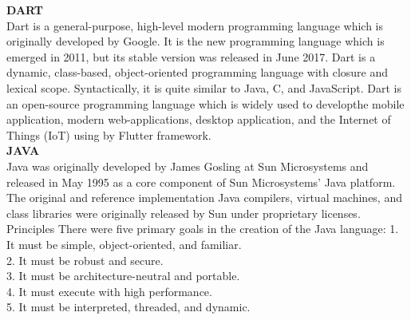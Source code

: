 \documentclass[12pt,a4paper,final]{extreport}
\begin{document}
\textbf{DART}\\
\hspace{01.5cm}Dart is a general-purpose, high-level modern programming language which
is originally developed by Google. It is the new programming language which is
emerged in 2011, but its stable version was released in June 2017. Dart is a dynamic, class-based, object-oriented programming language with closure and lexical scope. Syntactically, it is quite similar to Java, C, and JavaScript. Dart is an
open-source programming language which is widely used to developthe mobile application, modern web-applications, desktop application, and the Internet of Things
(IoT) using by Flutter framework.\\


\textbf{JAVA}\\
\hspace{01.5cm}Java was originally developed by James Gosling at Sun Microsystems and
released in May 1995 as a core component of Sun Microsystems’ Java platform.
The original and reference implementation Java compilers, virtual machines, and
class libraries were originally released by Sun under proprietary licenses.
Principles
There were five primary goals in the creation of the Java language:
1. It must be simple, object-oriented, and familiar.\\
2. It must be robust and secure.\\
3. It must be architecture-neutral and portable.\\
4. It must execute with high performance.\\
5. It must be interpreted, threaded, and dynamic.
\\
\end{document}
